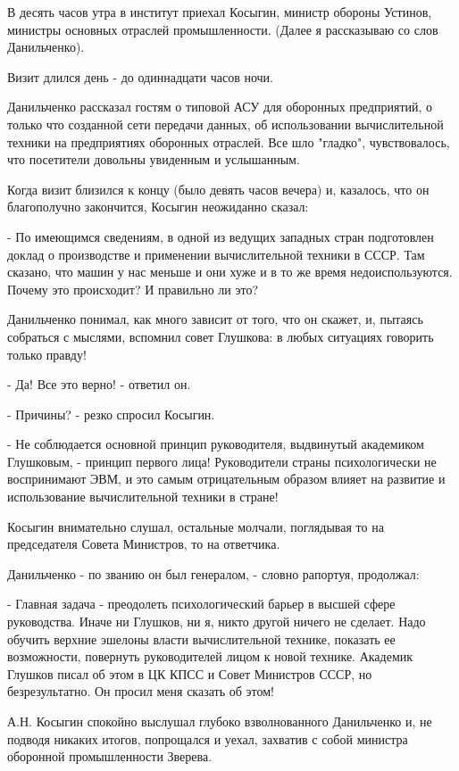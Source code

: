 В десять часов утра в институт приехал Косыгин, министр обороны Устинов,
министры основных отраслей промышленности. (Далее я рассказываю со слов
Данильченко).

Визит длился день - до одиннадцати часов ночи.

Данильченко рассказал гостям о типовой АСУ для оборонных предприятий, о только
что созданной сети передачи данных, об использовании вычислительной техники на
предприятиях оборонных отраслей. Все шло "гладко", чувствовалось, что посетители
довольны увиденным и услышанным.

Когда визит близился к концу (было девять часов вечера) и, казалось, что он
благополучно закончится, Косыгин неожиданно сказал:

- По имеющимся сведениям, в одной из ведущих западных стран подготовлен доклад о
производстве и применении вычислительной техники в СССР. Там сказано, что машин
у нас меньше и они хуже и в то же время недоиспользуются. Почему это происходит?
И правильно ли это?

Данильченко понимал, как много зависит от того, что он скажет, и, пытаясь
собраться с мыслями, вспомнил совет Глушкова: в любых ситуациях говорить только
правду!

- Да! Все это верно! - ответил он.

- Причины? - резко спросил Косыгин.

- Не соблюдается основной принцип руководителя, выдвинутый академиком Глушковым,
- принцип первого лица! Руководители страны психологически не воспринимают ЭВМ,
и это самым отрицательным образом влияет на развитие и использование
вычислительной техники в стране!

Косыгин внимательно слушал, остальные молчали, поглядывая то на председателя
Совета Министров, то на ответчика.

Данильченко - по званию он был генералом, - словно рапортуя, продолжал:

- Главная задача - преодолеть психологический барьер в высшей сфере руководства.
Иначе ни Глушков, ни я, никто другой ничего не сделает. Надо обучить верхние
эшелоны власти вычислительной технике, показать ее возможности, повернуть
руководителей лицом к новой технике. Академик Глушков писал об этом в ЦК КПСС и
Совет Министров СССР, но безрезультатно. Он просил меня сказать об этом!

А.Н. Косыгин спокойно выслушал глубоко взволнованного Данильченко и, не подводя
никаких итогов, попрощался и уехал, захватив с собой министра оборонной
промышленности Зверева.

